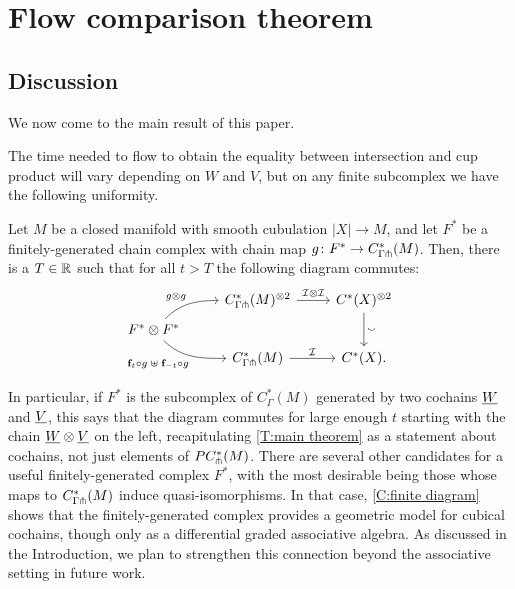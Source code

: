 
\section{Flow comparison theorem}\label{S:flow comparison theorem}

\subsection{Discussion}

We now come to the main result of this paper.

\maintheorem*

The time needed to flow to obtain the equality between intersection and cup product will vary depending on $W$ and $V$, but on any finite subcomplex we have the following uniformity.

\begin{corollary}\label{C:finite diagram}
	Let $M$ be a closed manifold with smooth cubulation $|X| \to M$, and let $F^*$ be a finitely-generated chain complex with chain map $g \colon F^*\to C^*_{\Gamma \pitchfork}(M)$.
	Then, there is a $T \in \mathbb{R}$ such that for all $t > T$ the following diagram commutes:
	\begin{equation*}
		\begin{tikzcd} [row sep=tiny]
			& C^*_{\Gamma \pf}(M)^{\otimes 2} \arrow[r, "\cI \otimes \cI"] & \cochains(X)^{\otimes 2} \arrow[dd, "\sms"] \\
			F^*\otimes F^* \arrow[ur, in=180, out=45,"g\otimes g"] \arrow[dr, in=180, out=-45, "\f_t \circ g \; \uplus \; \f_{-t} \circ g"']& & \\
			& C^*_{\Gamma \pf}(M) \arrow[r, "\cI"] & \cochains(X).
		\end{tikzcd}
	\end{equation*}
\end{corollary}

In particular, if $F^*$ is the subcomplex of $C^*_\Gamma(M)$ generated by two cochains $\underline{W}$ and $\underline{V}$, this says that the diagram commutes for large enough $t$ starting with the chain $\underline{W}\otimes\underline{V}$ on the left, recapitulating \cref{T:main theorem} as a statement about cochains, not just elements of $PC_\pitchfork^*(M)$.
There are several other candidates for a useful finitely-generated complex $F^*$, with the most desirable being those whose maps to $C^*_{\Gamma \pitchfork}(M)$ induce quasi-isomorphisms.
In that case, \cref{C:finite diagram} shows that the finitely-generated complex provides a geometric model for cubical cochains, though only as a differential graded associative algebra.
As discussed in the Introduction, we plan to strengthen this connection beyond the associative setting in future work.

